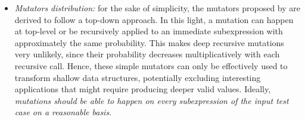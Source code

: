 \documentclass[sigconf, anonymous, review]{acmart}
\newcommand{\fuzzchick}{\textit{FuzzChick}\xspace}
\begin{document}
\begin{itemize}
\item \emph{Mutators distribution:}
%
for the sake of simplicity, the mutators proposed by
\citeauthor{lampropoulos2019coverage} are derived to follow a top-down approach.
%
In this light, a mutation can happen at top-level or be recursively applied to
an immediate subexpression with approximately the same probability.
%
%
This makes deep recursive mutations very unlikely, since their probability
decreases multiplicatively with each recursive call.
%
%
%
Hence, these simple mutators can only be effectively used to transform shallow
data structures, potentially excluding interesting applications that might
require producing deeper valid values.
%
%
Ideally, \emph{mutations should be able to happen on every subexpression of the
  input test case on a reasonable basis}.


%



\end{itemize}
\end{document}
